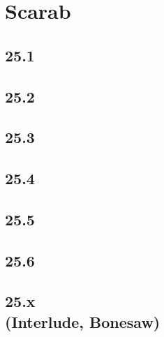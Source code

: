 \part{Scarab}
 \chapter{25.1}
 \chapter{25.2}
 \chapter{25.3}
 \chapter{25.4}
 \chapter{25.5}
 \chapter{25.6}
 \chapter[25.x (Interlude, Bonesaw)]{25.x\\(Interlude, Bonesaw)}








